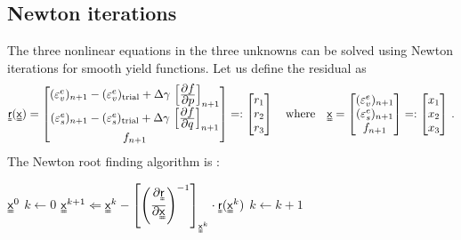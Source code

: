 \subsection{Newton iterations}
The three nonlinear equations in the three unknowns can be solved using Newton iterations
for smooth yield functions.  Let us define the residual as
\[
   \Mr(\Mx) = \begin{bmatrix} 
    (\Ve_v^e)_{n+1} -  (\Ve_v^e)_\Trial + \Delta\gamma\,\left[\Partial{f}{p}\right]_{n+1} \\
    (\Ve_s^e)_{n+1} -  (\Ve_s^e)_\Trial + \Delta\gamma\,\left[\Partial{f}{q}\right]_{n+1} \\
    f_{n+1} \end{bmatrix} =: \begin{bmatrix} r_1 \\ r_2 \\ r_3 \end{bmatrix}
   \quad \text{where} \quad
   \Mx = \begin{bmatrix} (\Ve_v^e)_{n+1} \\ (\Ve_s^e)_{n+1} \\ f_{n+1} \end{bmatrix} 
        =: \begin{bmatrix} x_1 \\ x_2 \\ x_3 \end{bmatrix} \,.
\]
The Newton root finding algorithm is :
\begin{algorithm}
  \begin{algorithmic}
    \Require $\Mx^0$
    \State $k \leftarrow 0$
      \State $\Mx^{k+1} \Leftarrow \Mx^k - \left[\left(\Partial{\Mr}{\Mx}\right)^{-1}\right]_{\Mx^k}\cdot
              \Mr(\Mx^k)$
      \State $k \leftarrow k+1$
    \EndWhile
  \end{algorithmic}
\end{algorithm}

